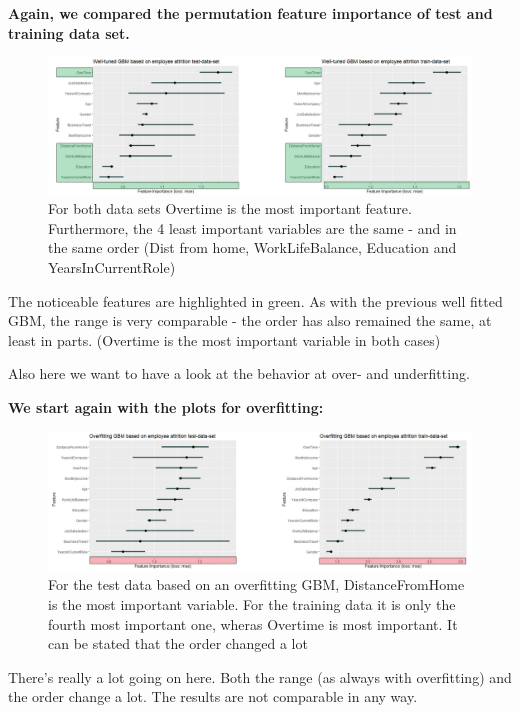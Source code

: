 \documentclass[]{krantz}
\begin{document}
\textbf{Again, we compared the permutation feature importance of test
and training data set.}

\begin{figure}
\includegraphics[width=40.38in]{images/IBM_well} \caption{For both data sets Overtime is the most important feature. Furthermore, the 4 least important variables are the same - and in the same order (Dist from home, WorkLifeBalance, Education and YearsInCurrentRole)}\label{fig:unnamed-chunk-57}
\end{figure}

The noticeable features are highlighted in green. As with the previous
well fitted GBM, the range is very comparable - the order has also
remained the same, at least in parts. (Overtime is the most important
variable in both cases)

Also here we want to have a look at the behavior at over- and
underfitting.

\textbf{We start again with the plots for overfitting:}

\begin{figure}
\includegraphics[width=40.1in]{images/IBM_over} \caption{For the test data based on an overfitting GBM, DistanceFromHome is the most important variable. For the training data it is only the fourth most important one, wheras Overtime is most important. It can be stated that the order changed a lot}\label{fig:unnamed-chunk-58}
\end{figure}

There's really a lot going on here. Both the range (as always with
overfitting) and the order change a lot. The results are not comparable
in any way.
\end{document}

